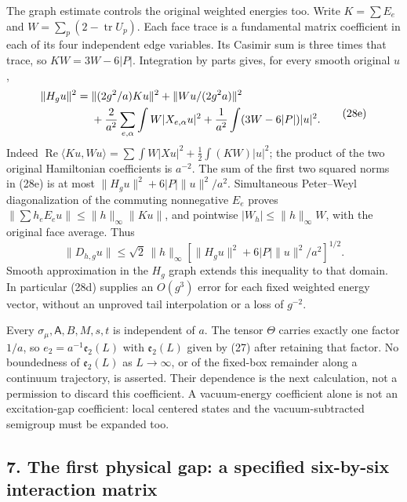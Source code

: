 \documentclass[
  11pt,
]{article}
\begin{document}
The graph estimate controls the original weighted energies too. Write
\(K=\sum E_e\) and \(W=\sum_p(2-\operatorname{tr}U_p)\). Each face trace
is a fundamental matrix coefficient in each of its four independent edge
variables. Its Casimir sum is three times that trace, so \(KW=3W-6|P|\).
Integration by parts gives, for every smooth original \(u\), \[
 \begin{split}
 \|H_gu\|^2={}&\|(2g^2/a)Ku\|^2+\|Wu/(2g^2a)\|^2\\
 &+{2\over a^2}\sum_{e,\alpha}\int W|X_{e,\alpha}u|^2
                 +{1\over a^2}\int(3W-6|P|)|u|^2.
 \end{split}
 \tag{28e}
\] Indeed \(\operatorname{Re}\langle Ku,Wu\rangle
=\sum\int W|Xu|^2+\tfrac12\int(KW)|u|^2\); the product of the two
original Hamiltonian coefficients is \(a^{-2}\). The sum of the first
two squared norms in (28e) is at most \(\|H_gu\|^2+6|P|\|u\|^2/a^2\).
Simultaneous Peter--Weyl diagonalization of the commuting nonnegative
\(E_e\) proves \(\|\sum h_eE_eu\|\le\|h\|_\infty\|Ku\|\), and pointwise
\(|W_h|\le\|h\|_\infty W\), with the original face average. Thus \[
 \|D_{h,g}u\|\le\sqrt2\,\|h\|_\infty
          [\|H_gu\|^2+6|P|\|u\|^2/a^2]^{1/2}.
 \tag{28f}
\] Smooth approximation in the \(H_g\) graph extends this inequality to
that domain. In particular (28d) supplies an \(O(g^3)\) error for each
fixed weighted energy vector, without an unproved tail interpolation or
a loss of \(g^{-2}\).

Every \(\sigma_\mu,\mathsf A,B,M,s,t\) is independent of \(a\). The
tensor \(\Theta\) carries exactly one factor \(1/a\), so
\(e_2=a^{-1}\mathfrak e_2(L)\) with \(\mathfrak e_2(L)\) given by (27)
after retaining that factor. No boundedness of \(\mathfrak e_2(L)\) as
\(L\to\infty\), or of the fixed-box remainder along a continuum
trajectory, is asserted. Their dependence is the next calculation, not a
permission to discard this coefficient. A vacuum-energy coefficient
alone is not an excitation-gap coefficient: local centered states and
the vacuum-subtracted semigroup must be expanded too.

\subsection{7. The first physical gap: a specified six-by-six
interaction
matrix}\label{weak-coupling-part-15-the-first-physical-gap-a-specified-six-by-six-interaction-matrix}
\end{document}
